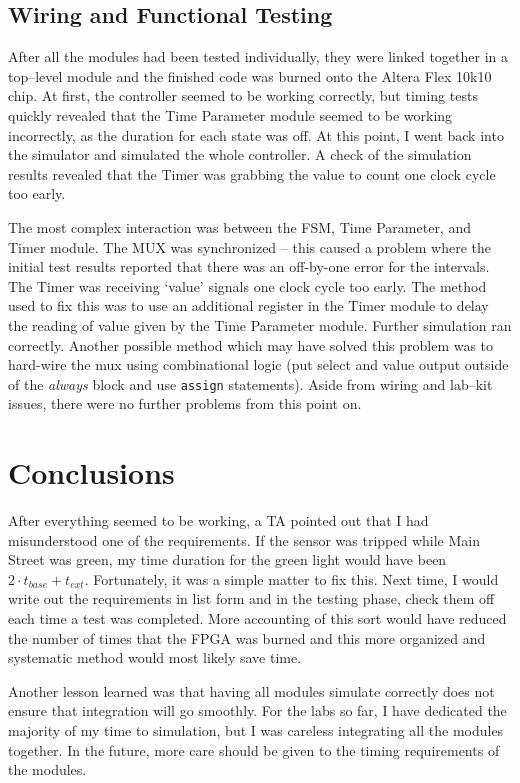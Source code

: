 \documentclass[11]{article}
\begin{document}
	\subsection{Wiring and Functional Testing}
	After all the modules had been tested individually, they were linked
	together in a top--level module and the finished code was burned onto
	the Altera Flex 10k10 chip.  At first, the controller seemed to be
	working correctly, but timing tests quickly revealed that the Time Parameter
	module seemed to be working incorrectly, as the duration for each state
	was off.  At this point, I went back into the simulator and simulated
	the whole controller.  A check of the simulation results revealed that
	the Timer was grabbing the value to count one clock cycle too early.

	The most complex interaction was between the FSM, Time Parameter, and
	Timer module.  The MUX was synchronized -- this caused a problem where
	the initial test results reported that there was an off-by-one error
	for the intervals.  The Timer was receiving `value' signals one clock
	cycle too early.  The method used to fix this was to use an additional
	register in the Timer module to delay the reading of value given by the
	Time Parameter module.  Further simulation ran correctly.  Another possible
	method which may have solved this problem was to hard-wire the mux using
	combinational logic (put select and value output outside of the
	\emph{always} block and use \texttt{assign} statements).  Aside from wiring
	and lab--kit issues, there were no further problems from this point on.


\section{Conclusions}
	After everything seemed to be working, a TA pointed out that I had
	misunderstood one of the requirements.  If the sensor was tripped
	while Main Street was green, my time duration for the green light would
	have been $2 \cdot t_{base} + t_{ext}$.  Fortunately, it was a simple
	matter to fix this.  Next time, I would write out the requirements in list
	form and in the testing phase, check them off each time a test was
	completed.  More accounting of this sort would have reduced the number of
	times that the FPGA was burned and this more organized and systematic
	method would most likely save time.

	Another lesson learned was that having all modules simulate correctly does
	not ensure that integration will go smoothly.  For the labs so far, I have
	dedicated the majority of my time to simulation, but I was careless
	integrating all the modules together.  In the future, more care should
	be given to the timing requirements of the modules.
\end{document}
